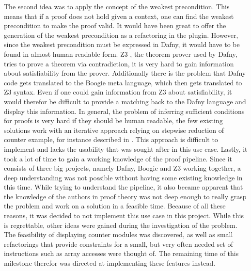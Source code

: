 The second idea was to apply the concept of the weakest precondition. This means that if a proof does not hold given a context, one can find the weakest precondition to make the proof valid. It would have been great to offer the generation of the weakest precondition as a refactoring in the plugin. However, since the weakest precondition must be expressed in Dafny, it would have to be found in almost human readable form. Z3 \cite{z3}, the theorem prover used by Dafny, tries to prove a theorem via contradiction, it is very hard to gain information about satisfiability from the prover. Additionally there is the problem that Dafny code gets translated to the Boogie\cite{boogie} meta language, which then gets translated to Z3 syntax. Even if one could gain information from Z3 about satisfiability, it would therefor be difficult to provide a matching back to the Dafny language and display this information. In general, the problem of inferring sufficient conditions for proofs is very hard if they should be human readable, the few existing solutions work with an iterative approach relying on stepwise reduction of counter example, for instance described in \cite{preInference}. This approach is difficult to implement and lacks the usability that was sought after in this use case.\newline
Lastly, it took a lot of time to gain a working knowledge of the proof pipeline. Since it consists of three big projects, namely Dafny, Boogie \cite{boogie} and Z3 working together, a deep understanding was not possible without having some existing knowledge in this time. While trying to understand the pipeline, it also became apparent that the knowledge of the authors in proof theory was not deep enough to really grasp the problem and work on a solution in a feasible time. \newline
Because of all these reasons, it was decided to not implement this use case in this project. While this is regrettable, other ideas were gained during the investigation of the problem. The feasibility of displaying counter modules was discovered, as well as small refactorings that provide constraints for a small, but very often needed set of instructions such as array accesses were thought of. The remaining time of this milestone therefor was directed at implementing these features instead. 

